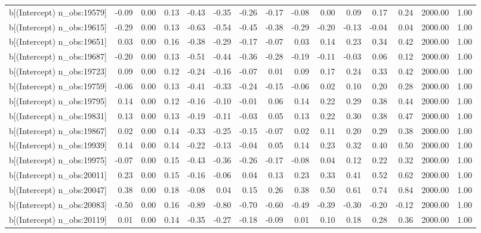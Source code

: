 \begin{table}[ht]
\begin{tabular}{rrrrrrrrrrrrrrr}
  b[(Intercept) n\_obs:19579] & -0.09 & 0.00 & 0.13 & -0.43 & -0.35 & -0.26 & -0.17 & -0.08 & 0.00 & 0.09 & 0.17 & 0.24 & 2000.00 & 1.00 \\ 
  b[(Intercept) n\_obs:19615] & -0.29 & 0.00 & 0.13 & -0.63 & -0.54 & -0.45 & -0.38 & -0.29 & -0.20 & -0.13 & -0.04 & 0.04 & 2000.00 & 1.00 \\ 
  b[(Intercept) n\_obs:19651] & 0.03 & 0.00 & 0.16 & -0.38 & -0.29 & -0.17 & -0.07 & 0.03 & 0.14 & 0.23 & 0.34 & 0.42 & 2000.00 & 1.00 \\ 
  b[(Intercept) n\_obs:19687] & -0.20 & 0.00 & 0.13 & -0.51 & -0.44 & -0.36 & -0.28 & -0.19 & -0.11 & -0.03 & 0.06 & 0.12 & 2000.00 & 1.00 \\ 
  b[(Intercept) n\_obs:19723] & 0.09 & 0.00 & 0.12 & -0.24 & -0.16 & -0.07 & 0.01 & 0.09 & 0.17 & 0.24 & 0.33 & 0.42 & 2000.00 & 1.00 \\ 
  b[(Intercept) n\_obs:19759] & -0.06 & 0.00 & 0.13 & -0.41 & -0.33 & -0.24 & -0.15 & -0.06 & 0.02 & 0.10 & 0.20 & 0.28 & 2000.00 & 1.00 \\ 
  b[(Intercept) n\_obs:19795] & 0.14 & 0.00 & 0.12 & -0.16 & -0.10 & -0.01 & 0.06 & 0.14 & 0.22 & 0.29 & 0.38 & 0.44 & 2000.00 & 1.00 \\ 
  b[(Intercept) n\_obs:19831] & 0.13 & 0.00 & 0.13 & -0.19 & -0.11 & -0.03 & 0.05 & 0.13 & 0.22 & 0.30 & 0.38 & 0.47 & 2000.00 & 1.00 \\ 
  b[(Intercept) n\_obs:19867] & 0.02 & 0.00 & 0.14 & -0.33 & -0.25 & -0.15 & -0.07 & 0.02 & 0.11 & 0.20 & 0.29 & 0.38 & 2000.00 & 1.00 \\ 
  b[(Intercept) n\_obs:19939] & 0.14 & 0.00 & 0.14 & -0.22 & -0.13 & -0.04 & 0.05 & 0.14 & 0.23 & 0.32 & 0.40 & 0.50 & 2000.00 & 1.00 \\ 
  b[(Intercept) n\_obs:19975] & -0.07 & 0.00 & 0.15 & -0.43 & -0.36 & -0.26 & -0.17 & -0.08 & 0.04 & 0.12 & 0.22 & 0.32 & 2000.00 & 1.00 \\ 
  b[(Intercept) n\_obs:20011] & 0.23 & 0.00 & 0.15 & -0.16 & -0.06 & 0.04 & 0.13 & 0.23 & 0.33 & 0.41 & 0.52 & 0.62 & 2000.00 & 1.00 \\ 
  b[(Intercept) n\_obs:20047] & 0.38 & 0.00 & 0.18 & -0.08 & 0.04 & 0.15 & 0.26 & 0.38 & 0.50 & 0.61 & 0.74 & 0.84 & 2000.00 & 1.00 \\ 
  b[(Intercept) n\_obs:20083] & -0.50 & 0.00 & 0.16 & -0.89 & -0.80 & -0.70 & -0.60 & -0.49 & -0.39 & -0.30 & -0.20 & -0.12 & 2000.00 & 1.00 \\ 
  b[(Intercept) n\_obs:20119] & 0.01 & 0.00 & 0.14 & -0.35 & -0.27 & -0.18 & -0.09 & 0.01 & 0.10 & 0.18 & 0.28 & 0.36 & 2000.00 & 1.00 \\ 

\end{tabular}
\end{table}
